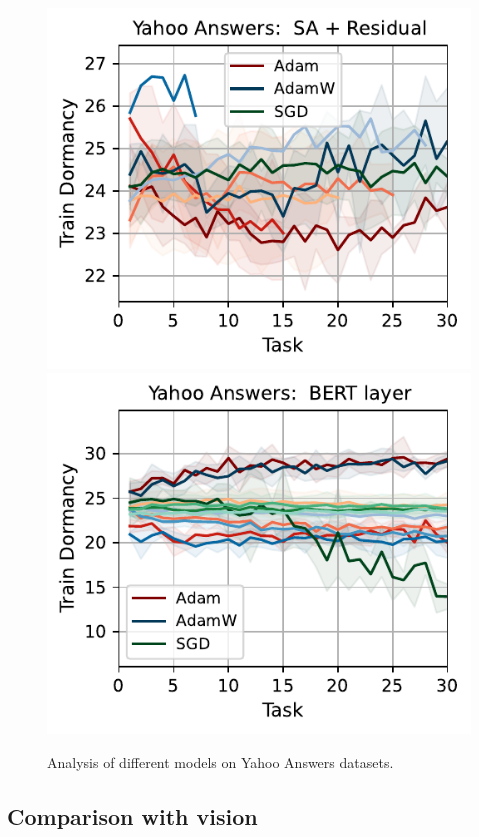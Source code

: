 \begin{figure}[htb!]
{        \includegraphics[width=\textwidth]{figs/Dormancy/nlp/attention_residual/yahoo_answers_40.pdf}
        \includegraphics[width=\textwidth]{figs/Dormancy/nlp/bert_layer/yahoo_answers_40.pdf}
    }
    \caption{Analysis of different models on Yahoo Answers datasets.}
    \label{fig:yahoo_models_analysis}
\end{figure}



\subsection{Comparison with vision}

